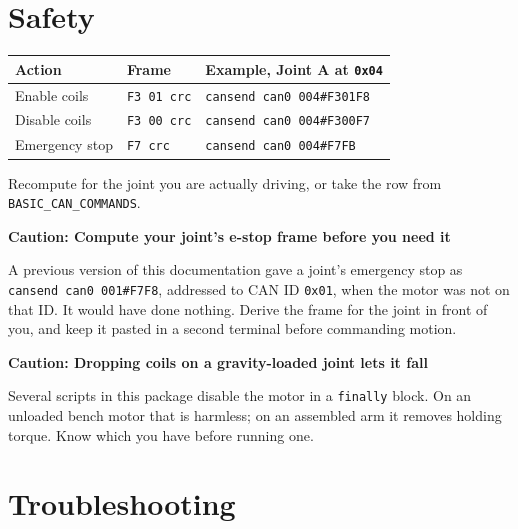 \documentclass[11pt,letterpaper]{article}
\newenvironment{caution}[1]{%
    \par\addvspace{8pt}%
    \noindent{\color{cautionred}\rule{\linewidth}{0.8pt}}\par\vspace{2pt}
    \noindent\textbf{\color{cautionred}Caution: #1}\par\vspace{2pt}
}{%
    \par\vspace{2pt}\noindent{\color{cautionred}\rule{\linewidth}{0.4pt}}%
    \par\addvspace{8pt}%
}
\begin{document}
\section{Safety}
\label{sec:safety}

\begin{center}
\begin{tabular}{lll}
\toprule
\textbf{Action} & \textbf{Frame} & \textbf{Example, Joint A at \texttt{0x04}} \\ \midrule
Enable coils   & \texttt{F3 01 crc} & \texttt{cansend can0 004\#F301F8} \\
Disable coils  & \texttt{F3 00 crc} & \texttt{cansend can0 004\#F300F7} \\
Emergency stop & \texttt{F7 crc}    & \texttt{cansend can0 004\#F7FB} \\
\bottomrule
\end{tabular}
\end{center}

Recompute for the joint you are actually driving, or take the row from
\texttt{BASIC\_CAN\_COMMANDS}.

\begin{caution}{Compute your joint's e-stop frame before you need it}
A previous version of this documentation gave a joint's emergency stop as
\texttt{cansend can0 001\#F7F8}, addressed to CAN ID \texttt{0x01}, when the motor
was not on that ID. It would have done nothing. Derive the frame for the joint in
front of you, and keep it pasted in a second terminal before commanding motion.
\end{caution}

\begin{caution}{Dropping coils on a gravity-loaded joint lets it fall}
Several scripts in this package disable the motor in a \texttt{finally} block. On an
unloaded bench motor that is harmless; on an assembled arm it removes holding
torque. Know which you have before running one.
\end{caution}

\section{Troubleshooting}
\label{sec:troubleshooting}
\end{document}
